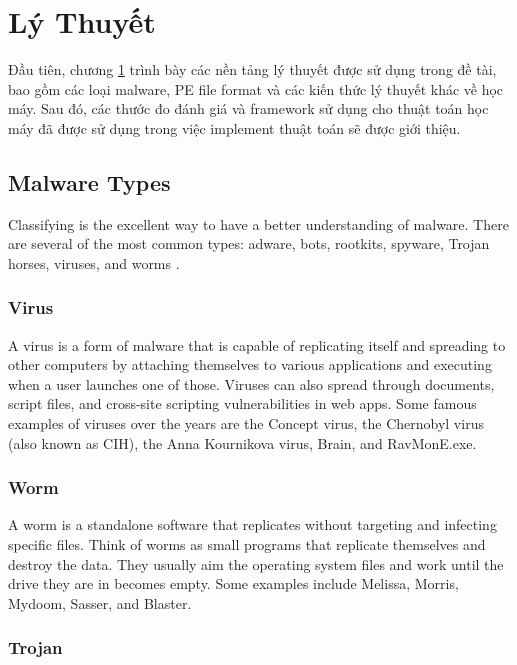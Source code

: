 \chapter{Lý Thuyết}
\label{chap:background}
\graphicspath{{Chapter3/Figs/}}

\begin{chapabstract}
Đầu tiên, chương \ref{chap:background} trình bày các nền tảng lý thuyết được sử dụng trong đề tài, bao gồm các loại malware, PE file format và các kiến thức lý thuyết khác về học máy. Sau đó, các thước đo đánh giá và framework sử dụng cho thuật toán học máy đã được sử dụng trong việc implement thuật toán sẽ được giới thiệu.
\end{chapabstract}

\section{Malware Types}
\label{sec:malware}

Classifying is the excellent way to have a better understanding of malware. There are several of the most common types: adware, bots, rootkits, spyware, Trojan horses, viruses, and worms \cite{neil2012common}.

\subsection{Virus}

A virus is a form of malware that is capable of replicating itself and spreading to other computers by attaching themselves to various applications and executing when a user launches one of those. Viruses can also spread through documents, script files, and cross-site scripting vulnerabilities in web apps. Some famous examples of viruses over the years are the Concept virus, the Chernobyl virus (also known as CIH), the Anna Kournikova virus, Brain, and RavMonE.exe.

\subsection{Worm}

A worm is a standalone software that replicates without targeting and infecting specific files. Think of worms as small programs that replicate themselves and destroy the data. They usually aim the operating system files and work until the drive they are in becomes empty. Some examples include Melissa, Morris, Mydoom, Sasser, and Blaster.

\subsection{Trojan}

